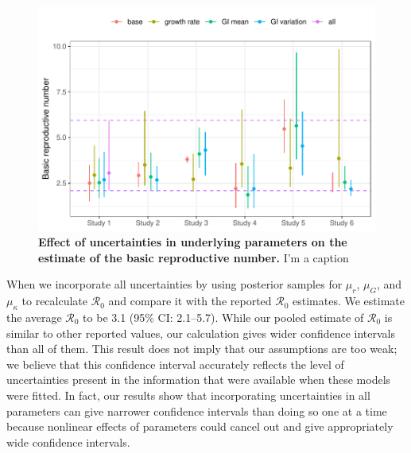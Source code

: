 \documentclass[12pt]{article}
\newcommand{\eref}[1]{(\ref{eq:#1})}
\newcommand{\fref}[1]{Fig.~\ref{fig:#1}}
\begin{document}

\begin{figure}[t]
\includegraphics[width=\textwidth]{compare_R0.pdf}
\caption{
\textbf{Effect of uncertainties in underlying parameters on the estimate of the basic reproductive number.}
I'm a caption
}
\label{fig:R0}
\end{figure}

When we incorporate all uncertainties by using posterior samples for $\mu_r$, $\mu_G$, and $\mu_\kappa$ to recalculate $\mathcal R_0$ and compare it with the reported $\mathcal R_0$ estimates.
We estimate the average $\mathcal R_0$ to be 3.1 (95\% CI: 2.1--5.7).
While our pooled estimate of $\mathcal R_0$ is similar to other reported values, our calculation gives wider confidence intervals than all of them.
This result does not imply that our assumptions are too weak;
we believe that this confidence interval accurately reflects the level of uncertainties present in the information that were available when these models were fitted.
In fact, our results show that incorporating uncertainties in all parameters can give narrower confidence intervals than doing so one at a time because nonlinear effects of parameters could cancel out and give appropriately wide confidence intervals.
\end{document}
